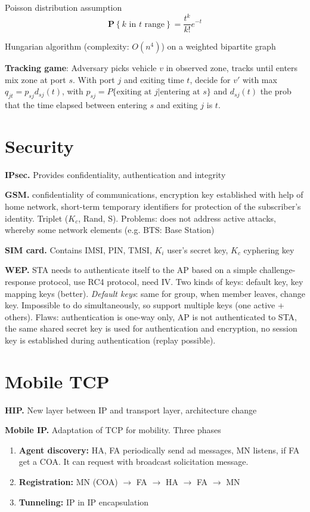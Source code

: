 \documentclass[10pt,twocolumn]{article}
\renewcommand{\l}{\left}
\renewcommand{\r}{\right}
\renewcommand{\bf}{\textbf}
\renewcommand{\P}[1]{\mathbf{P}\l\{#1\r\}}
\begin{document}
Poisson distribution assumption
\[
  \P{k \text{ in } t \text{ range}} = \frac{t^k}{k!}e^{-t}
\]


Hungarian algorithm (complexity: $O(n^4)$) on a weighted bipartite graph

\textbf{Tracking game}: Adversary picks vehicle $v$ in observed zone, tracks until enters mix zone at port $s$. With port $j$ and exiting time $t$, decide for $v'$ with max $q_{jt} = p_{sj}d_{sj}(t)$, with $p_{sj} = P\{\text{exiting at } j | \text{entering at } s\}$ and $d_{sj}(t)$ the prob that the time elapsed between entering $s$ and exiting $j$ is $t$.

\section{Security}

\bf{IPsec.} Provides confidentiality, authentication and integrity

\bf{GSM.} confidentiality of communications, encryption key established with help of home network, short-term temporary identifiers for protection of the subscriber’s identity. Triplet ($K_c$, Rand, S). Problems: does not address active attacks, whereby some network elements (e.g. BTS: Base Station)

\bf{SIM card.} Contains IMSI, PIN, TMSI, $K_i$ user's secret key, $K_c$ cyphering key

\bf{WEP.} STA needs to authenticate itself to the AP based on a simple challenge-response protocol, use RC4 protocol, need IV. Two kinds of keys: default key, key mapping keys (better). \emph{Default keys}: same for group, when member leaves, change key.  Impossible to do simultaneously, so support multiple keys (one active + others). Flaws: authentication is one-way only, AP is not authenticated to STA, the same shared secret key is used for authentication and encryption, no session key is established during authentication (replay possible).

\section{Mobile TCP}

\bf{HIP.} New layer between IP and transport layer, architecture change

\bf{Mobile IP.} Adaptation of TCP for mobility. Three phases
\begin{enumerate}
  \item \bf{Agent discovery:} HA, FA periodically send ad messages, MN listens, if FA get a COA. It can request with broadcast solicitation message.
  \item \bf{Registration:} MN (COA) $\to$ FA $\to$ HA $\to$ FA $\to$ MN
  \item \bf{Tunneling:} IP in IP encapsulation
\end{enumerate}
\end{document}
